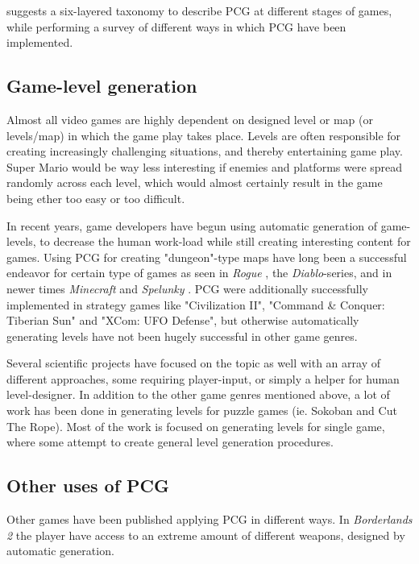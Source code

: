 \documentclass[a4paper,titlepage,final, twoside]{report}
\begin{document}
\citet{hendrikx2013procedural} suggests a six-layered taxonomy to describe PCG at different stages of games, while performing a survey of different ways in which PCG have been implemented.

\subsection{Game-level generation}
Almost all video games are highly dependent on designed level or map (or levels/map) in which the game play takes place. Levels are often responsible for creating increasingly challenging situations, and thereby entertaining game play. Super Mario would be way less interesting if enemies and platforms were spread randomly across each level, which would almost certainly result in the game being ether too easy or too difficult.

In recent years, game developers have begun using automatic generation of game-levels, to decrease the human work-load while still creating interesting content for games. Using PCG for creating "dungeon"-type maps have long been a successful endeavor for certain type of games as seen in \textit{Rogue} \citeyearpar{game:rogue}, the \textit{Diablo}-series, and in newer times \textit{Minecraft} \citeyearpar{game:minecraft} and \textit{Spelunky} \citeyearpar{game:spelunky}. PCG were additionally successfully implemented in strategy games like "Civilization II", "Command \& Conquer: Tiberian Sun" and "XCom: UFO Defense", but otherwise automatically generating levels have not been hugely successful in other game genres.

Several scientific projects have focused on the topic as well with an array of different approaches, some requiring player-input, or simply a helper for human level-designer. In addition to the other game genres mentioned above, a lot of work has been done in generating levels for puzzle games (ie. Sokoban and Cut The Rope).
Most of the work is focused on generating levels for single game, where some attempt to create general level generation procedures.


\subsection{Other uses of PCG}
Other games have been published applying PCG in different ways. In \textit{Borderlands 2} \citeyearpar{game:borderlands} the player have access to an extreme amount of different weapons, designed by automatic generation.
\end{document}

